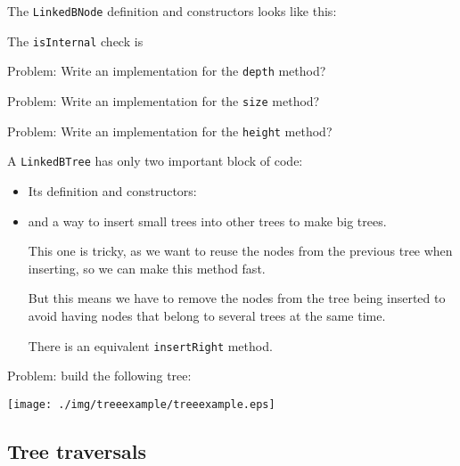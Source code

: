 \documentclass[a4paper, 9pt]{extarticle}
\begin{document}
The \texttt{LinkedBNode} definition and constructors looks like this:


The \texttt{isInternal} check is


Problem: Write an implementation for the \texttt{depth} method?


Problem: Write an implementation for the \texttt{size} method?


Problem: Write an implementation for the \texttt{height} method?


A \texttt{LinkedBTree} has only two important block of code:

\begin{itemize}

  \item Its definition and constructors:


  \item and a way to insert small trees into other trees to make big trees.

    This one is tricky, as we want to reuse the nodes from the previous tree
    when inserting, so we can make this method fast.

    But this means we have to remove the nodes from the tree being inserted to
    avoid having nodes that belong to several trees at the same time.


    There is an equivalent \texttt{insertRight} method.

\end{itemize}

Problem: build the following tree:

\begin{center}
  \texttt{[image: ./img/treeexample/treeexample.eps]}
\end{center}


\subsection{Tree traversals}
\end{document}
